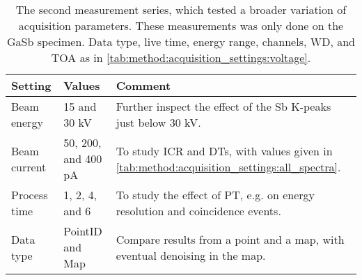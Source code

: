 \begin{table}[phtb]
    \begin{center}
        \caption{
            The second measurement series, which tested a broader variation of acquisition parameters.
            These measurements was only done on the GaSb specimen.
            Data type, live time, energy range, channels, WD, and TOA as in \cref{tab:method:acquisition_settings:voltage}.
        }
        \renewcommand*{\arraystretch}{1.2}
        \label{tab:method:acquisition_settings:other}
        \begin{tabular}{p{2cm}p{3cm}p{8.6cm}}
            \hline
            \textbf{Setting} & \textbf{Values}     & \textbf{Comment}                                                                               \\
            \hline
            Beam energy      & 15 and 30 kV        & Further inspect the effect of the Sb K-peaks just below 30 kV.                                 \\
            Beam current     & 50, 200, and 400 pA & To study ICR and DTs, with values given in \cref{tab:method:acquisition_settings:all_spectra}. \\
            Process time     & 1, 2, 4, and 6      & To study the effect of PT, e.g. on energy resolution and coincidence events.                   \\
            Data type        & PointID and Map     & Compare results from a point and a map, with eventual denoising in the map.                    \\
            \hline
        \end{tabular}
    \end{center}
\end{table}
